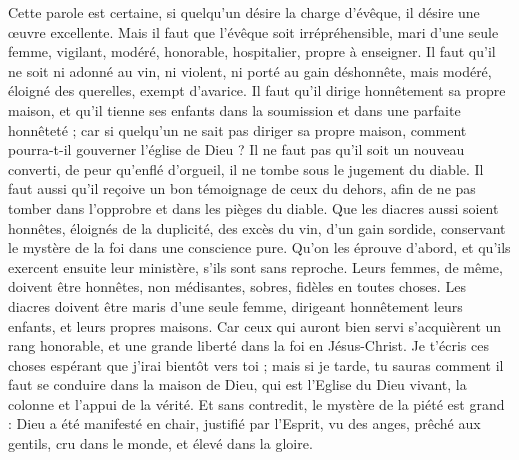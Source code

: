 \begin{multicols}{2}
\VerseOne{}Cette parole est certaine, si quelqu'un désire la charge d’évêque, il désire une œuvre excellente.
Mais il faut que l'évêque soit irrépréhensible, mari d'une seule femme, vigilant, modéré, honorable, hospitalier, propre à enseigner.
Il faut qu’il ne soit ni adonné au vin, ni violent, ni porté au gain déshonnête, mais modéré, éloigné des querelles, exempt d’avarice.
Il faut qu’il dirige honnêtement sa propre maison, et qu’il tienne ses enfants dans la soumission et dans une parfaite honnêteté ;
car si quelqu'un ne sait pas diriger sa propre maison, comment pourra-t-il gouverner l'église de Dieu ?
Il ne faut pas qu’il soit un nouveau converti, de peur qu'enflé d'orgueil, il ne tombe sous le jugement du diable.
Il faut aussi qu'il reçoive un bon témoignage de ceux du dehors, afin de ne pas tomber dans l’opprobre et dans les pièges du diable.
Que les diacres aussi soient honnêtes, éloignés de la duplicité, des excès du vin, d’un gain sordide,
conservant le mystère de la foi dans une conscience pure.
Qu’on les éprouve d’abord, et qu’ils exercent ensuite leur ministère, s’ils sont sans reproche.
Leurs femmes, de même, doivent être honnêtes, non médisantes, sobres, fidèles en toutes choses.
Les diacres doivent être maris d'une seule femme, dirigeant honnêtement leurs enfants, et leurs propres maisons.
Car ceux qui auront bien servi s’acquièrent un rang honorable, et une grande liberté dans la foi en Jésus-Christ.
Je t'écris ces choses espérant que j'irai bientôt vers toi ;
mais si je tarde, tu sauras comment il faut se conduire dans la maison de Dieu, qui est l'Eglise du Dieu vivant, la colonne et l'appui de la vérité.
Et sans contredit, le mystère de la piété est grand : Dieu a été manifesté en chair, justifié par l’Esprit, vu des anges, prêché aux gentils, cru dans le monde, et élevé dans la gloire.

\end{multicols}
